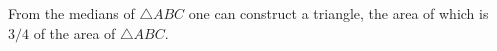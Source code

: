 From the medians of $\triangle ABC$ one can construct a triangle, the area of which is $3/4$ of the area of $\triangle ABC$.
